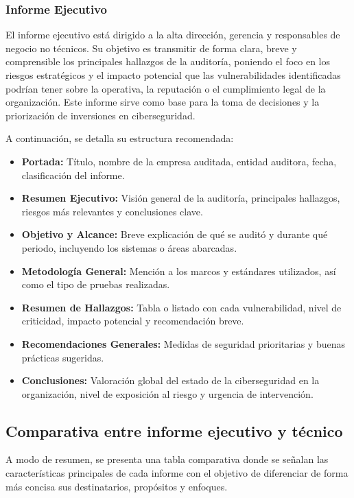 \documentclass[a4paper, 11pt]{article}
\begin{document}
\subsubsection{Informe Ejecutivo}

El informe ejecutivo está dirigido a la alta dirección, gerencia y responsables de negocio no técnicos. Su objetivo es transmitir de forma clara, breve y comprensible los principales hallazgos de la auditoría, poniendo el foco en los riesgos estratégicos y el impacto potencial que las vulnerabilidades identificadas podrían tener sobre la operativa, la reputación o el cumplimiento legal de la organización. Este informe sirve como base para la toma de decisiones y la priorización de inversiones en ciberseguridad.


A continuación, se detalla su estructura recomendada:

\begin{itemize}
  \item \textbf{Portada:} Título, nombre de la empresa auditada, entidad auditora, fecha, clasificación del informe.
  \item \textbf{Resumen Ejecutivo:} Visión general de la auditoría, principales hallazgos, riesgos más relevantes y conclusiones clave.
  \item \textbf{Objetivo y Alcance:} Breve explicación de qué se auditó y durante qué periodo, incluyendo los sistemas o áreas abarcadas.
  \item \textbf{Metodología General:} Mención a los marcos y estándares utilizados, así como el tipo de pruebas realizadas.
  \item \textbf{Resumen de Hallazgos:} Tabla o listado con cada vulnerabilidad, nivel de criticidad, impacto potencial y recomendación breve.
  \item \textbf{Recomendaciones Generales:} Medidas de seguridad prioritarias y buenas prácticas sugeridas.
  \item \textbf{Conclusiones:} Valoración global del estado de la ciberseguridad en la organización, nivel de exposición al riesgo y urgencia de intervención.
\end{itemize}





\subsection*{Comparativa entre informe ejecutivo y técnico}


A modo de resumen, se presenta una tabla comparativa donde se señalan las características principales de cada informe con el objetivo de diferenciar de forma más concisa sus destinatarios, propósitos y enfoques.
\end{document}
